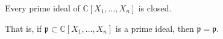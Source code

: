 Every prime ideal of $\mathbb{C}[X_1, \ldots, X_n]$ is closed.

That is, if $\mathfrak{p} \subset \mathbb{C}[X_1, \ldots, X_n]$ is a prime ideal, then $\overline{\mathfrak{p}} = \mathfrak{p}$.
